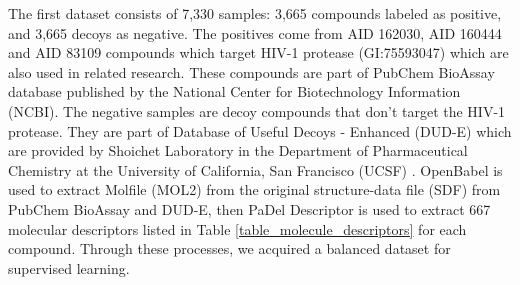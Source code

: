 \documentclass[conference,compsoc,12pt]{IEEEtran}
\begin{document}
	The first dataset consists of 7,330 samples: 3,665 compounds labeled as positive, and 3,665 decoys as negative. The positives come from AID 162030, AID 160444 and AID 83109 compounds which target HIV-1 protease (GI:75593047) which are also used in related research\cite{yanuar2014virtual}. These compounds are part of PubChem BioAssay database published by the National Center for Biotechnology Information (NCBI). The negative samples are decoy compounds that don't target the HIV-1 protease. They are part of Database of Useful Decoys - Enhanced (DUD-E) which are provided by Shoichet Laboratory in the Department of Pharmaceutical Chemistry at the University of California, San Francisco (UCSF) \cite{mysinger2012directory}. OpenBabel\cite{o2011open} is used to extract Molfile (MOL2) from the original structure-data file (SDF) from PubChem BioAssay and DUD-E, then PaDel Descriptor\cite{yap2011padel} is used to extract 667 molecular descriptors listed in Table \ref{table_molecule_descriptors} for each compound. Through these processes, we acquired a balanced dataset for supervised learning.
	
\end{document}
